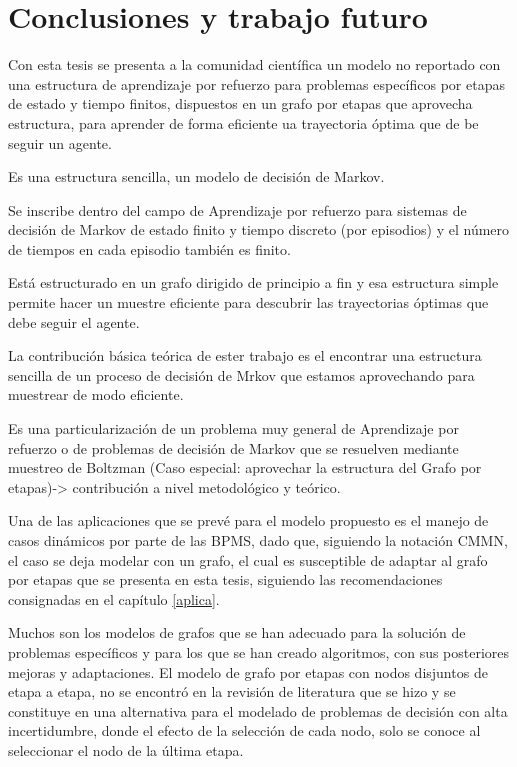 \chapter{Conclusiones y trabajo futuro}
Con esta tesis se presenta a la comunidad científica un modelo no reportado con una estructura de aprendizaje por refuerzo para problemas específicos por etapas de estado y tiempo finitos, dispuestos en un grafo por etapas que aprovecha estructura, para aprender de forma eficiente ua trayectoria óptima que de be seguir un agente.

Es una estructura sencilla, un modelo de decisión de Markov. 

Se inscribe dentro del campo de Aprendizaje por refuerzo para sistemas de decisión de Markov de estado finito y tiempo discreto (por episodios) y el número de tiempos en cada episodio también es finito.

Está estructurado en un grafo dirigido de principio a fin y esa estructura simple permite hacer un muestre eficiente para descubrir las trayectorias óptimas que debe seguir el agente.

La contribución básica teórica de ester trabajo es el encontrar una estructura sencilla de un proceso de decisión de Mrkov que estamos aprovechando para muestrear de modo eficiente.

Es una particularización de un problema muy general de Aprendizaje por refuerzo o de problemas de decisión de Markov que se resuelven mediante muestreo de Boltzman (Caso especial: aprovechar la estructura del Grafo por etapas)-> contribución a nivel metodológico y teórico. 

Una de las aplicaciones que se prevé para el modelo propuesto es el manejo de casos dinámicos por parte de las BPMS, dado que, siguiendo la notación CMMN, el caso se deja modelar con un grafo, el cual es susceptible de adaptar al grafo por etapas que se presenta en esta tesis, siguiendo las recomendaciones consignadas en el capítulo \ref{aplica}.

Muchos son los modelos de grafos que se han adecuado para la solución de problemas específicos y para los que se han creado algoritmos, con sus posteriores mejoras y adaptaciones. El modelo de grafo por etapas con nodos disjuntos de etapa a  etapa, no se encontró en la revisión de literatura que se hizo y se constituye en una alternativa para el modelado de problemas de decisión con alta incertidumbre, donde el efecto de la selección de cada nodo, solo se conoce al seleccionar el nodo de la última etapa.


